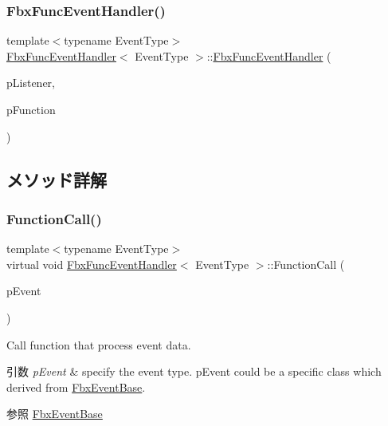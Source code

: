 \subsubsection{\texorpdfstring{Fbx\+Func\+Event\+Handler()}{FbxFuncEventHandler()}}
{\footnotesize\ttfamily template$<$typename Event\+Type$>$ \\
\hyperlink{class_fbx_func_event_handler}{Fbx\+Func\+Event\+Handler}$<$ Event\+Type $>$\+::\hyperlink{class_fbx_func_event_handler}{Fbx\+Func\+Event\+Handler} (\begin{DoxyParamCaption}\item[{\hyperlink{class_fbx_listener}{Fbx\+Listener} $\ast$}]{p\+Listener,  }\item[{Callback\+Fnc}]{p\+Function }\end{DoxyParamCaption})}



\subsection{メソッド詳解}
\mbox{\label{class_fbx_func_event_handler_a6111e1a7e1a0e60170a2de498fe44766}} 
\subsubsection{\texorpdfstring{Function\+Call()}{FunctionCall()}}
{\footnotesize\ttfamily template$<$typename Event\+Type$>$ \\
virtual void \hyperlink{class_fbx_func_event_handler}{Fbx\+Func\+Event\+Handler}$<$ Event\+Type $>$\+::Function\+Call (\begin{DoxyParamCaption}\item[{const \hyperlink{class_fbx_event_base}{Fbx\+Event\+Base} \&}]{p\+Event }\end{DoxyParamCaption})\hspace{0.3cm}{\ttfamily [virtual]}}

Call function that process event data. 
\begin{DoxyParams}{引数}
{\em p\+Event} & specify the event type. p\+Event could be a specific class which derived from \hyperlink{class_fbx_event_base}{Fbx\+Event\+Base}. \\
\hline
\end{DoxyParams}
\begin{DoxySeeAlso}{参照}
\hyperlink{class_fbx_event_base}{Fbx\+Event\+Base} 
\end{DoxySeeAlso}


